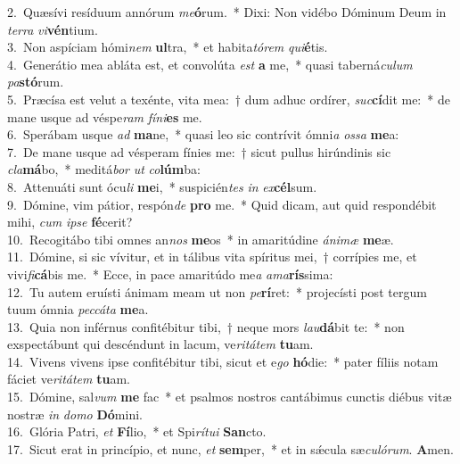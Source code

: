 {2.~}Quæsívi resíduum annórum \textit{me}\textbf{ó}rum.~* Dixi: Non vidébo Dóminum Deum in \textit{ter}\textit{ra} \textit{vi}\textbf{vén}tium.\\
{3.~}Non aspíciam hómi\textit{nem} \textbf{ul}tra,~* et habita\textit{tó}\textit{rem} \textit{qui}\textbf{é}tis.\\
{4.~}Generátio mea abláta est, et convolúta \textit{est} \textbf{a} me,~* quasi taberná\textit{cu}\textit{lum} \textit{pa}\textbf{stó}rum.\\
{5.~}Præcísa est velut a texénte, vita mea:~† dum adhuc ordírer, \textit{suc}\textbf{cí}dit me:~* de mane usque ad véspe\textit{ram} \textit{fí}\textit{ni}\textbf{es} me.\\
{6.~}Sperábam usque \textit{ad} \textbf{ma}ne,~* quasi leo sic contrívit ómni\textit{a} \textit{os}\textit{sa} \textbf{me}a:\\
{7.~}De mane usque ad vésperam fínies me:~† sicut pullus hirúndinis sic \textit{cla}\textbf{má}bo,~* meditá\textit{bor} \textit{ut} \textit{co}\textbf{lúm}ba:\\
{8.~}Attenuáti sunt ócu\textit{li} \textbf{me}i,~* suspicién\textit{tes} \textit{in} \textit{ex}\textbf{cél}sum.\\
{9.~}Dómine, vim pátior, respón\textit{de} \textbf{pro} me.~* Quid dicam, aut quid respondébit mihi, \textit{cum} \textit{i}\textit{pse} \textbf{fé}cerit?\\
{10.~}Recogitábo tibi omnes an\textit{nos} \textbf{me}os~* in amaritúdine \textit{á}\textit{ni}\textit{mæ} \textbf{me}æ.\\
{11.~}Dómine, si sic vívitur, et in tálibus vita spíritus mei,~† corrípies me, et vivi\textit{fi}\textbf{cá}bis me.~* Ecce, in pace amaritúdo me\textit{a} \textit{a}\textit{ma}\textbf{rís}sima:\\
{12.~}Tu autem eruísti ánimam meam ut non \textit{pe}\textbf{rí}ret:~* projecísti post tergum tuum ómnia \textit{pec}\textit{cá}\textit{ta} \textbf{me}a.\\
{13.~}Quia non inférnus confitébitur tibi,~† neque mors \textit{lau}\textbf{dá}bit te:~* non exspectábunt qui descéndunt in lacum, ve\textit{ri}\textit{tá}\textit{tem} \textbf{tu}am.\\
{14.~}Vivens vivens ipse confitébitur tibi, sicut et e\textit{go} \textbf{hó}die:~* pater fíliis notam fáciet ve\textit{ri}\textit{tá}\textit{tem} \textbf{tu}am.\\
{15.~}Dómine, sal\textit{vum} \textbf{me} fac~* et psalmos nostros cantábimus cunctis diébus vitæ nostræ \textit{in} \textit{do}\textit{mo} \textbf{Dó}mini.\\
{16.~}Glória Patri, \textit{et} \textbf{Fí}lio,~* et Spi\textit{rí}\textit{tu}\textit{i} \textbf{San}cto.\\
{17.~}Sicut erat in princípio, et nunc, \textit{et} \textbf{sem}per,~* et in sǽcula sæ\textit{cu}\textit{ló}\textit{rum}. \textbf{A}men.\\

